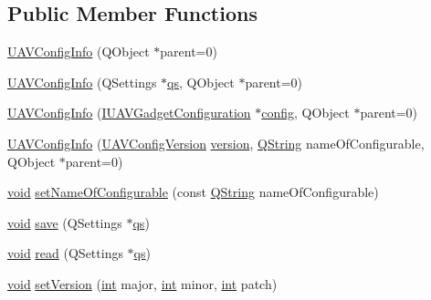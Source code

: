 \subsection*{Public Member Functions}
\begin{DoxyCompactItemize}
\item 
\hyperlink{group___core_plugin_gacf5020eb455875fe2ce543b2e8d24315}{U\-A\-V\-Config\-Info} (Q\-Object $\ast$parent=0)
\item 
\hyperlink{group___core_plugin_ga933409bece83e4aed5c3efac0079f7c4}{U\-A\-V\-Config\-Info} (Q\-Settings $\ast$\hyperlink{analyze_i_n_s_g_p_s_8m_a620a138c8981e0536c569d7761df4548}{qs}, Q\-Object $\ast$parent=0)
\item 
\hyperlink{group___core_plugin_ga293738c41bbf0024336c21246611d365}{U\-A\-V\-Config\-Info} (\hyperlink{class_core_1_1_i_u_a_v_gadget_configuration}{I\-U\-A\-V\-Gadget\-Configuration} $\ast$\hyperlink{deflate_8c_a4473b5227787415097004fd39f55185e}{config}, Q\-Object $\ast$parent=0)
\item 
\hyperlink{group___core_plugin_ga877152eb896ac34a5ad81d03fe104712}{U\-A\-V\-Config\-Info} (\hyperlink{class_core_1_1_u_a_v_config_version}{U\-A\-V\-Config\-Version} \hyperlink{group___core_plugin_ga445d72afa775caf72f6d61884a36e7aa}{version}, \hyperlink{group___u_a_v_objects_plugin_gab9d252f49c333c94a72f97ce3105a32d}{Q\-String} name\-Of\-Configurable, Q\-Object $\ast$parent=0)
\item 
\hyperlink{group___u_a_v_objects_plugin_ga444cf2ff3f0ecbe028adce838d373f5c}{void} \hyperlink{group___core_plugin_ga448ae0ec57eeaf4fafc1323489437506}{set\-Name\-Of\-Configurable} (const \hyperlink{group___u_a_v_objects_plugin_gab9d252f49c333c94a72f97ce3105a32d}{Q\-String} name\-Of\-Configurable)
\item 
\hyperlink{group___u_a_v_objects_plugin_ga444cf2ff3f0ecbe028adce838d373f5c}{void} \hyperlink{group___core_plugin_ga285242175c9cff69e9370fa285744b28}{save} (Q\-Settings $\ast$\hyperlink{analyze_i_n_s_g_p_s_8m_a620a138c8981e0536c569d7761df4548}{qs})
\item 
\hyperlink{group___u_a_v_objects_plugin_ga444cf2ff3f0ecbe028adce838d373f5c}{void} \hyperlink{group___core_plugin_ga62813f8316e5bdf825f049c85e1d210d}{read} (Q\-Settings $\ast$\hyperlink{analyze_i_n_s_g_p_s_8m_a620a138c8981e0536c569d7761df4548}{qs})
\item 
\hyperlink{group___u_a_v_objects_plugin_ga444cf2ff3f0ecbe028adce838d373f5c}{void} \hyperlink{group___core_plugin_ga3ea89d37d0ba1f4c972006e6b761c922}{set\-Version} (\hyperlink{ioapi_8h_a787fa3cf048117ba7123753c1e74fcd6}{int} major, \hyperlink{ioapi_8h_a787fa3cf048117ba7123753c1e74fcd6}{int} minor, \hyperlink{ioapi_8h_a787fa3cf048117ba7123753c1e74fcd6}{int} patch)

\end{DoxyCompactItemize}
